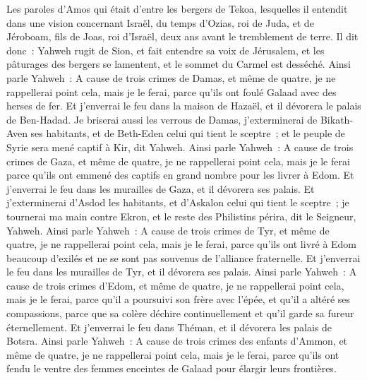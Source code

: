 \begin{multicols}{2}
\VerseOne{}Les paroles d'Amos qui était d'entre les bergers de Tekoa, lesquelles il entendit dans une vision concernant Israël, du temps d'Ozias, roi de Juda, et de Jéroboam, fils de Joas, roi d'Israël, deux ans avant le tremblement de terre.
Il dit donc~: Yahweh rugit de Sion, et fait entendre sa voix de Jérusalem, et les pâturages des bergers se lamentent, et le sommet du Carmel est desséché.
Ainsi parle Yahweh~: A cause de trois crimes de Damas, et même de quatre, je ne rappellerai point cela, mais je le ferai, parce qu'ils ont foulé Galaad avec des herses de fer.
Et j'enverrai le feu dans la maison de Hazaël, et il dévorera le palais de Ben-Hadad.
Je briserai aussi les verrous de Damas, j'exterminerai de Bikath-Aven ses habitants, et de Beth-Eden celui qui tient le sceptre~; et le peuple de Syrie sera mené captif à Kir, dit Yahweh.
Ainsi parle Yahweh~: A cause de trois crimes de Gaza, et même de quatre, je ne rappellerai point cela, mais je le ferai parce qu'ils ont emmené des captifs en grand nombre pour les livrer à Edom.
Et j'enverrai le feu dans les murailles de Gaza, et il dévorera ses palais.
Et j'exterminerai d'Asdod les habitants, et d'Askalon celui qui tient le sceptre~; je tournerai ma main contre Ekron, et le reste des Philistins périra, dit le Seigneur, Yahweh.
Ainsi parle Yahweh~: A cause de trois crimes de Tyr, et même de quatre, je ne rappellerai point cela, mais je le ferai, parce qu'ils ont livré à Edom beaucoup d'exilés et ne se sont pas souvenus de l'alliance fraternelle.
Et j'enverrai le feu dans les murailles de Tyr, et il dévorera ses palais.
Ainsi parle Yahweh~: A cause de trois crimes d'Edom, et même de quatre, je ne rappellerai point cela, mais je le ferai, parce qu'il a poursuivi son frère avec l'épée, et qu'il a altéré ses compassions, parce que sa colère déchire continuellement et qu'il garde sa fureur éternellement.
Et j'enverrai le feu dans Théman, et il dévorera les palais de Botsra.
Ainsi parle Yahweh~: A cause de trois crimes des enfants d'Ammon, et même de quatre, je ne rappellerai point cela, mais je le ferai, parce qu'ils ont fendu le ventre des femmes enceintes de Galaad pour élargir leurs frontières.

\end{multicols}
